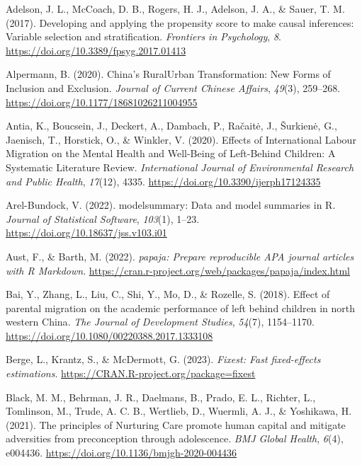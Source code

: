 \documentclass[
  man,floatsintext]{apa7}
\newlength{\cslhangindent}
\newlength{\cslentryspacingunit} %
\newenvironment{CSLReferences}[2] %
 {%
  \setlength{\parindent}{0pt}
  \ifodd #1
  \let\oldpar\par
  \def\par{\hangindent=\cslhangindent\oldpar}
  \fi
  \setlength{\parskip}{#2\cslentryspacingunit}
 }%
 {}
\begin{document}
\hypertarget{refs}{}
\begin{CSLReferences}{1}{0}
\leavevmode{}%
Adelson, J. L., McCoach, D. B., Rogers, H. J., Adelson, J. A., \& Sauer, T. M. (2017). Developing and applying the propensity score to make causal inferences: Variable selection and stratification. \emph{Frontiers in Psychology}, \emph{8}. \url{https://doi.org/10.3389/fpsyg.2017.01413}

\leavevmode{}%
Alpermann, B. (2020). {China}{'}s Rural{\textendash}Urban Transformation: New Forms of Inclusion and Exclusion. \emph{Journal of Current Chinese Affairs}, \emph{49}(3), 259--268. \url{https://doi.org/10.1177/18681026211004955}

\leavevmode{}%
Antia, K., Boucsein, J., Deckert, A., Dambach, P., Račaitė, J., Šurkienė, G., Jaenisch, T., Horstick, O., \& Winkler, V. (2020). Effects of International Labour Migration on the Mental Health and Well-Being of Left-Behind Children: A Systematic Literature Review. \emph{International Journal of Environmental Research and Public Health}, \emph{17}(12), 4335. \url{https://doi.org/10.3390/ijerph17124335}

\leavevmode{}%
Arel-Bundock, V. (2022). {modelsummary}: Data and model summaries in {R}. \emph{Journal of Statistical Software}, \emph{103}(1), 1--23. \url{https://doi.org/10.18637/jss.v103.i01}

\leavevmode{}%
Aust, F., \& Barth, M. (2022). \emph{{papaja}: {Prepare} reproducible {APA} journal articles with {R Markdown}}. \url{https://cran.r-project.org/web/packages/papaja/index.html}

\leavevmode{}%
Bai, Y., Zhang, L., Liu, C., Shi, Y., Mo, D., \& Rozelle, S. (2018). Effect of parental migration on the academic performance of left behind children in north western {China}. \emph{The Journal of Development Studies}, \emph{54}(7), 1154--1170. \url{https://doi.org/10.1080/00220388.2017.1333108}

\leavevmode{}%
Berge, L., Krantz, S., \& McDermott, G. (2023). \emph{Fixest: Fast fixed-effects estimations}. \url{https://CRAN.R-project.org/package=fixest}

\leavevmode{}%
Black, M. M., Behrman, J. R., Daelmans, B., Prado, E. L., Richter, L., Tomlinson, M., Trude, A. C. B., Wertlieb, D., Wuermli, A. J., \& Yoshikawa, H. (2021). The principles of Nurturing Care promote human capital and mitigate adversities from preconception through adolescence. \emph{BMJ Global Health}, \emph{6}(4), e004436. \url{https://doi.org/10.1136/bmjgh-2020-004436}


\end{CSLReferences}
\end{document}

